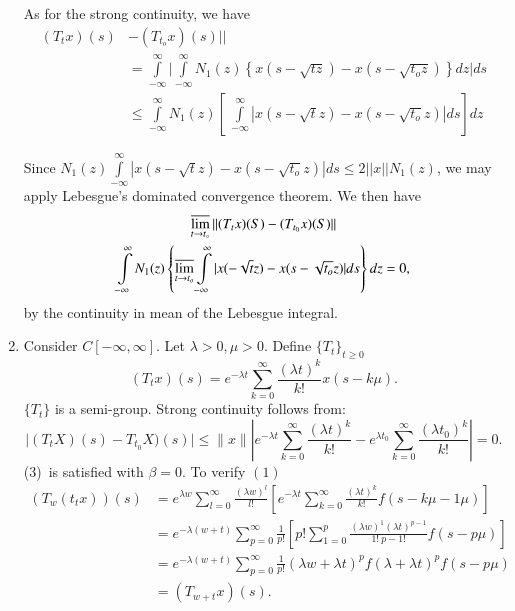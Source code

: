 \begin{enumerate}[I]
 As for the strong continuity, we have 
 \begin{align*}
  (T_t x)(s) & - (T_{t_o} x) (s)||\\ 
  &= \int\limits^{ \infty}_{ -
   \infty}\bigg| \int\limits^{ \infty}_{ - \infty} N_1 (z) \left\{ x
  (s - \sqrt{tz}) - x (s - \sqrt{t_o z})\right\} dz | ds \\ 
  & \leq \int\limits^\infty_{-\infty} N_1 (z) \left[
   ~\int\limits^{ \infty}_{ - \infty} |x(s -\sqrt{t}z)-x( s -
   \sqrt{t_o} z)| ds \right]dz 
 \end{align*}
 
 Since $N_1 (z) \int\limits^{ \infty}_{ -\infty} | x(s - \sqrt{t}z )
 - x (s - \sqrt{t_o} z) | ds \leq 2 || x || N_1 (z)$, we may apply
 Lebesgue's dominated convergence theorem. We then have 
 \begin{multline*}
 \varlimsup_{ t \to t_\circ} || (T_t x) (S) - (T_{t_0} x ) (S)||\\
 \int\limits^{\infty }_{- \infty}N_1 (z) \left\{ \varlimsup_{ t \to
  t_o} \int\limits_{-\infty}^{\infty} | x( - \sqrt{t}z )- x(s -
 \sqrt{t_o} z)| ds \right\} dz = 0, 
 \end{multline*}
 by the continuity in mean of the Lebesgue integral. 
\item Consider $C[ - \infty, \infty]$. Let $\lambda > 0, \mu >
 0$. Define $\big\{T_t \big\}_{t \geq 0}$ 
 $$
 (T_t x )(s) = e^{- \lambda t}\sum^\infty_{ k = 0} \frac{(\lambda
  t)^k}{k!} x(s - k \mu ). 
 $$
 $\{ T_t \}$ is a semi-group. Strong continuity follows from: 
 $$
 \mid ( T_t X) (s) - T_{t_{0}} X) (s) \mid \leq \| x \|
 |e^{-\lambda t} \sum^{\infty}_{k=0} \frac{(\lambda t)^k}{k!}
 -e^{\lambda t_0} \sum^{\infty}_{k=0} \frac{(\lambda t_0)^k}{k !}
 | = 0. 
 $$
 (3)~\pageoriginale is satisfied with $ \beta = 0 $. To verify $ (1) $
 \begin{align*}
  (T_w (t_t x) ) (s) & = e^{\lambda w} \sum^{\infty}_{l=0} \frac{(
   \lambda w )^l}{l!} \left[ e^{- \lambda t} \sum^{\infty}_{k=0}
   \frac{( \lambda t)^k}{k!} f ( s-k \mu -1 \mu ) \right]\\ 
  &= e^{-\lambda ( w +t)} \sum^{\infty}_{p=0} \frac{1}{p!} \left[
   p! \sum^{p}_{1=0} \frac{(\lambda w)^1 ( \lambda t )^{p-1}}{1! ~
    p-1!} f (s-p \mu ) \right]\\ 
  &= e^{- \lambda ( w + t )} \sum^{\infty}_{p=0} \frac{1}{p!} (
  \lambda w + \lambda t)^p f ( \lambda + \lambda t)^p f ( s - p \mu
  ) \\ 
  &= ( T_{w+t} x) (s). \\
 \end{align*}
\end{enumerate}

